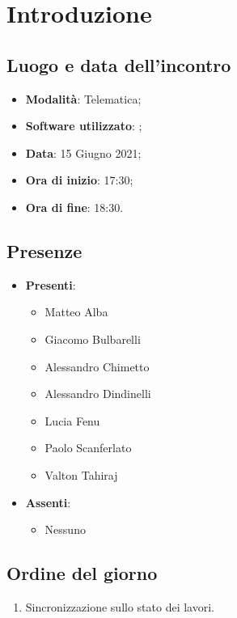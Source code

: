 \documentclass[]{article}
\begin{document}
	

	\newpage


		\section{Introduzione}
		\subsection{Luogo e data dell'incontro}
		\begin{itemize}
			\item \textbf{Modalità}: Telematica;
			\item \textbf{Software utilizzato}: ;
			\item \textbf{Data}: 15 Giugno 2021;
			\item \textbf{Ora di inizio}: 17:30;
			\item \textbf{Ora di fine}: 18:30.
		\end{itemize}

		\subsection{Presenze}
		\begin{itemize}
			\item \textbf{Presenti}:
			\begin{itemize}
				\item Matteo Alba
				\item Giacomo Bulbarelli
				\item Alessandro Chimetto
				\item Alessandro Dindinelli
				\item Lucia Fenu
				\item Paolo Scanferlato
				\item Valton Tahiraj
			\end{itemize}
			\item \textbf{Assenti}:
			\begin{itemize}
				\item Nessuno
			\end{itemize}
		\end{itemize}


		\subsection{Ordine del giorno}
		\begin{enumerate}
			\item Sincronizzazione sullo stato dei lavori.
		\end{enumerate}
\end{document}
